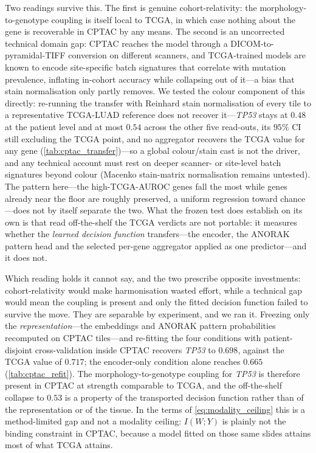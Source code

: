 Two readings survive this. The first is genuine cohort-relativity: the
morphology-to-genotype coupling is itself local to TCGA, in which case
nothing about the gene is recoverable in CPTAC by any means.
The second is an uncorrected technical domain gap:
CPTAC reaches the model through a DICOM-to-pyramidal-TIFF conversion on
different scanners, and TCGA-trained models are known to encode
site-specific batch signatures that correlate with mutation prevalence,
inflating in-cohort accuracy while collapsing out of it---a bias that
stain normalisation only partly removes.\cite{howard2021site}
We tested the colour component of this directly: re-running the transfer
with Reinhard stain normalisation of every tile to a representative
TCGA-LUAD reference does not recover it---\textit{TP53} stays at $0.48$
at the patient level and at most $0.54$ across the other five
read-outs, its $95\%$ CI still
excluding the TCGA point, and no aggregator recovers the TCGA value for
any gene (\cref{tab:cptac_transfer})---so a global colour/stain cast is
not the driver, and any technical account must rest on deeper scanner- or
site-level batch signatures beyond colour (Macenko stain-matrix
normalisation remains untested).
The pattern here---the high-TCGA-AUROC genes fall the most while genes
already near the floor are roughly preserved, a uniform regression toward
chance---does not by itself separate the two. What the frozen test does
establish on its own is that read off-the-shelf the TCGA verdicts are not
portable: it measures whether the \emph{learned decision function}
transfers---the \ctranspath{} encoder, the ANORAK pattern head and the
selected per-gene aggregator applied as one predictor---and it does not.

Which reading holds it cannot say, and the two prescribe opposite
investments: cohort-relativity would make harmonisation wasted effort, while
a technical gap would mean the coupling is present and only the fitted
decision function failed to survive the move. They are separable by
experiment, and we ran it. Freezing
only the \emph{representation}---the \ctranspath{} embeddings and ANORAK
pattern probabilities recomputed on CPTAC tiles---and re-fitting the four
conditions with patient-disjoint cross-validation inside CPTAC recovers
\textit{TP53} to $0.698$, against the TCGA value of $0.717$; the encoder-only
condition alone reaches $0.665$ (\cref{tab:cptac_refit}).
The morphology-to-genotype coupling for \textit{TP53} is therefore present in
CPTAC at strength comparable to TCGA, and the off-the-shelf collapse to
$0.53$ is a property of the transported decision function rather than of the
representation or of the tissue. In the terms of
\cref{eq:modality_ceiling} this is a method-limited gap and not a modality
ceiling: $I(W;Y)$ is plainly not the binding constraint in CPTAC, because a
model fitted on those same slides attains most of what TCGA attains.

